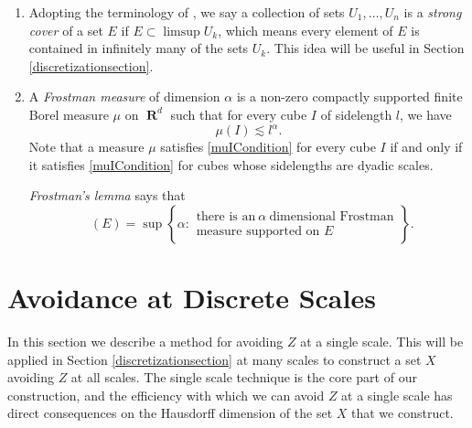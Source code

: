 \documentclass[dvipsnames,letterpaper,12pt]{article}
\numberwithin{equation}{section}
\theoremstyle{plain}
\DeclareMathOperator{\hausdim}{\dim_{\mathbf{H}}}
\DeclareMathOperator{\RR}{\mathbf{R}}
\begin{document}
\begin{enumerate}

	\item\label{strongCoverDefn} Adopting the terminology of \cite{KatzTao}, we say a collection of sets $U_1, \dots, U_n$ is a {\it strong cover} of a set $E$ if $E \subset \limsup U_k$, which means every element of $E$ is contained in infinitely many of the sets $U_k$. This idea will be useful in Section \ref{discretizationsection}.  


	\item\label{frostmanItem} A {\it Frostman measure} of dimension $\alpha$ is a non-zero compactly supported finite Borel measure $\mu$ on $\RR^d$ such that for every cube $I$ of sidelength $l$, we have
	\begin{equation}\label{muICondition}
	\mu(I) \lesssim l^\alpha.
	\end{equation}
	Note that a measure $\mu$ satisfies \eqref{muICondition} for every cube $I$ if and only if it satisfies \eqref{muICondition} for cubes whose sidelengths are dyadic scales.  

	 {\it Frostman's lemma} says that
	\[ \hausdim(E) = \sup \left\{ \alpha: \begin{array}{c} \text{there is an}\ \alpha\ \text{dimensional Frostman}\\
	\text{measure supported on $E$} \end{array} \right\}. \]
\end{enumerate}









\section{Avoidance at Discrete Scales}\label{discretesection}


In this section we describe a method for avoiding $Z$ at a single scale. This will be applied in Section \ref{discretizationsection} at many scales to construct a set $X$ avoiding $Z$ at all scales. The single scale technique is the core part of our construction, and the efficiency with which we can avoid $Z$ at a single scale has direct consequences on the Hausdorff dimension of the set $X$ that we construct.
\end{document}
